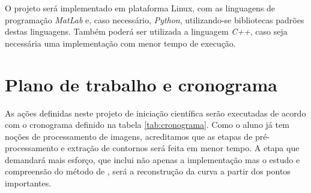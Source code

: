 \documentclass[
	12pt,				%
	oneside,			%
	a4paper,			%
	sumario=tradicional,
	english,			%
	french,				%
	spanish,			%
	brazil,				%
]{abntex2}
\begin{document}
O projeto será implementado em plataforma Linux, com as linguagens de programação \textit{MatLab} e, caso necessário, \textit{Python}, utilizando-se bibliotecas padrões destas linguagens. Também poderá ser utilizada a linguagem \textit{C++}, caso seja necessária uma implementação com menor tempo de execução.




\chapter{Plano de trabalho e cronograma}



As ações definidas neste projeto de iniciação científica serão executadas de acordo com o cronograma definido na tabela \ref{tab:cronograma}. Como o aluno já tem noções de processamento de imagens, acreditamos que as etapas de pré-processamento e extração de contornos será feita em menor tempo. A etapa que demandará mais esforço, que inclui não apenas a implementação mas o estudo e compreensão do método de , será a reconstrução da curva a partir dos pontos importantes.
\end{document}
